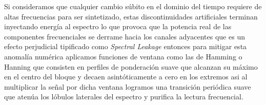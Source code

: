 \begin{enumerate}
    Si consideramos que cualquier cambio súbito en el dominio del tiempo requiere de altas frecuencias para ser sintetizado, estas discontinuidades artificiales terminan inyectando energía al espectro lo que provoca que la potencia real de las componentes frecuenciales se derrame hacia los canales adyacentes que es un efecto perjudicial tipificado como \textit{Spectral Leakage} entonces para mitigar esta anomalía numérica aplicamos funciones de ventana como las de Hamming o Hanning que consisten en perfiles de ponderación suave que alcanzan su máximo en el centro del bloque y decaen asintóticamente a cero en los extremos asi al multiplicar la señal por dicha ventana logramos una transición periódica suave que atenúa los lóbulos laterales del espectro y purifica la lectura frecuencial.
\end{enumerate}
